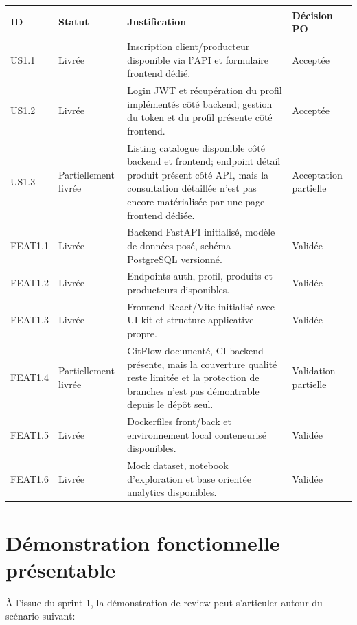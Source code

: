 \documentclass[11pt,a4paper]{article}
\begin{document}
\begin{longtable}{>{\raggedright\arraybackslash}p{2.2cm} >{\raggedright\arraybackslash}p{2.5cm} >{\raggedright\arraybackslash}p{8.4cm} >{\raggedright\arraybackslash}p{2.3cm}}
\toprule
\textbf{ID} & \textbf{Statut} & \textbf{Justification} & \textbf{Décision PO} \\
\midrule
\endhead
US1.1 & Livrée & Inscription client/producteur disponible via l'API et formulaire frontend dédié. & Acceptée \\
US1.2 & Livrée & Login JWT et récupération du profil implémentés côté backend; gestion du token et du profil présente côté frontend. & Acceptée \\
US1.3 & Partiellement livrée & Listing catalogue disponible côté backend et frontend; endpoint détail produit présent côté API, mais la consultation détaillée n'est pas encore matérialisée par une page frontend dédiée. & Acceptation partielle \\
FEAT1.1 & Livrée & Backend FastAPI initialisé, modèle de données posé, schéma PostgreSQL versionné. & Validée \\
FEAT1.2 & Livrée & Endpoints auth, profil, produits et producteurs disponibles. & Validée \\
FEAT1.3 & Livrée & Frontend React/Vite initialisé avec UI kit et structure applicative propre. & Validée \\
FEAT1.4 & Partiellement livrée & GitFlow documenté, CI backend présente, mais la couverture qualité reste limitée et la protection de branches n'est pas démontrable depuis le dépôt seul. & Validation partielle \\
FEAT1.5 & Livrée & Dockerfiles front/back et environnement local conteneurisé disponibles. & Validée \\
FEAT1.6 & Livrée & Mock dataset, notebook d'exploration et base orientée analytics disponibles. & Validée \\
\bottomrule
\end{longtable}

\section{Démonstration fonctionnelle présentable}

À l'issue du sprint 1, la démonstration de review peut s'articuler autour du scénario suivant:
\end{document}
